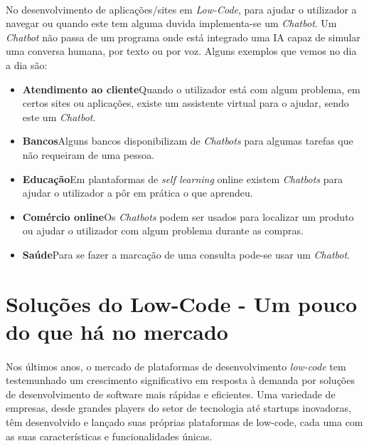 \documentclass[pdflatex,sn-mathphys-num]{sn-jnl}
\theoremstyle{thmstyleone}
\theoremstyle{thmstyletwo}
\theoremstyle{thmstylethree}
\begin{document}
\paragraph{}No desenvolvimento de aplicações/sites em \textit{Low-Code}, para ajudar o utilizador a navegar ou quando este tem alguma duvida implementa-se um \textit{Chatbot}. Um \textit{Chatbot} não passa de um programa onde está integrado uma IA\cite{bib15} capaz de simular uma conversa humana, por texto ou por voz. Alguns exemplos que vemos no dia a dia são:
\begin{itemize}
    \item \textbf{Atendimento ao cliente}\newline Quando o utilizador está com algum problema, em certos sites ou aplicações, existe um assistente virtual para o ajudar, sendo este um \textit{Chatbot}.
    \item \textbf{Bancos}\newline Alguns bancos disponibilizam de \textit{Chatbots} para algumas tarefas que não requeiram de uma pessoa.
    \item \textbf{Educação}\newline Em plantaformas de \textit{self learning} online existem \textit{Chatbots} para ajudar o utilizador a pôr em prática o que aprendeu.
    \item \textbf{Comércio online}\newline Os \textit{Chatbots} podem ser usados para localizar um produto ou ajudar o utilizador com algum problema durante as compras.
    \item \textbf{Saúde}\newline Para se fazer a marcação de uma consulta pode-se usar um \textit{Chatbot}.

\end{itemize}



\section{Soluções do Low-Code - Um pouco do que há no mercado}\label{sec7}

\paragraph{}Nos últimos anos, o mercado de plataformas de desenvolvimento \textit{low-code} tem testemunhado um crescimento significativo em resposta à demanda por soluções de desenvolvimento de software mais rápidas e eficientes. Uma variedade de empresas, desde grandes players do setor de tecnologia até startups inovadoras, têm desenvolvido e lançado suas próprias plataformas de low-code, cada uma com as suas características e funcionalidades únicas.
\end{document}

